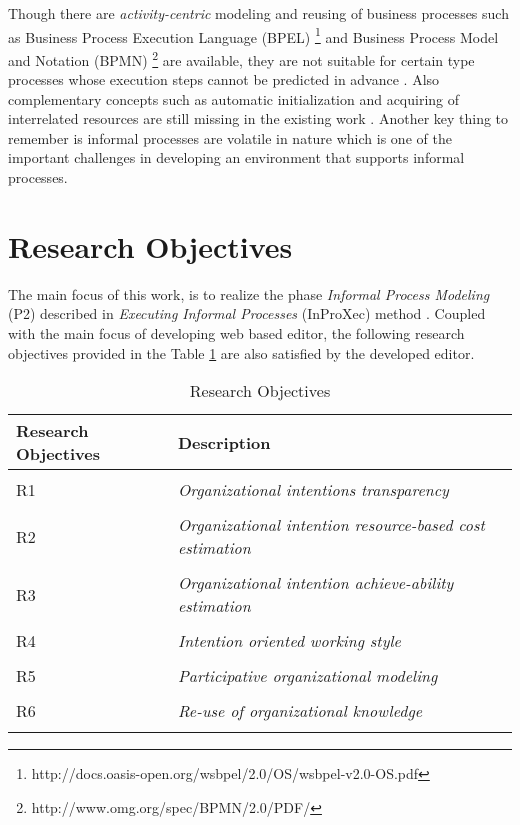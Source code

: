 Though there are \textit{activity-centric} modeling and reusing of business processes such as Business Process Execution Language (BPEL) \footnote{http://docs.oasis-open.org/wsbpel/2.0/OS/wsbpel-v2.0-OS.pdf} and Business Process Model and Notation (BPMN) \footnote{http://www.omg.org/spec/BPMN/2.0/PDF/} are available, they are not suitable for certain type processes whose execution steps cannot be predicted in advance \cite{Sungur2014a}. Also complementary concepts such as automatic initialization and acquiring of interrelated resources are still missing in the existing work \cite{Sungur2015}. Another key thing to remember is informal processes are volatile in nature which is one of the important challenges in developing an environment that supports informal processes.

\section {Research Objectives}
\label{sec:researchobjectives}
The main focus of this work, is to realize the phase \textit{Informal Process Modeling} (P2) described in \textit{Executing Informal Processes} (InProXec) method \cite{Sungur2015}. Coupled with the main focus of developing web based editor, the following research objectives provided in the Table \ref{tab:researchobjectives} are also satisfied by the developed editor. 

\label{sec:researchobj}
\begin{center}
	\begin{longtable}{p{5cm}p{11cm}} 
   	\toprule 
	\textbf{Research Objectives} & \textbf{Description} \\
	\midrule
	\endfirsthead
	\\
	R1 & \textit{Organizational intentions transparency}  \label{ro1} \\
	\\[-1.5ex]
	R2 & \textit{Organizational intention resource-based cost estimation}  \label{ro2} \\
	\\[-1.5ex]
	R3 & \textit{Organizational intention achieve-ability estimation} \label{ro3}\\
	\\[-1.5ex]
	R4 & \textit{Intention oriented working style}  \label{ro4}\\
	\\[-1.5ex]
	R5 & \textit{Participative organizational modeling}\label{ro5}\\
	\\[-1.5ex]
	R6 & \textit{Re-use of organizational knowledge} \label{ro6}\\	
	\bottomrule
	\caption{Research Objectives}
	\label{tab:researchobjectives}
	\end{longtable}	
\end{center}

